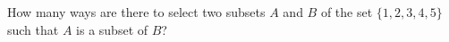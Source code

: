 How many ways are there to select two subsets $A$ and $B$ of the set $\{1,2,3,4,5\}$ such that $A$ is a subset of $B$?
